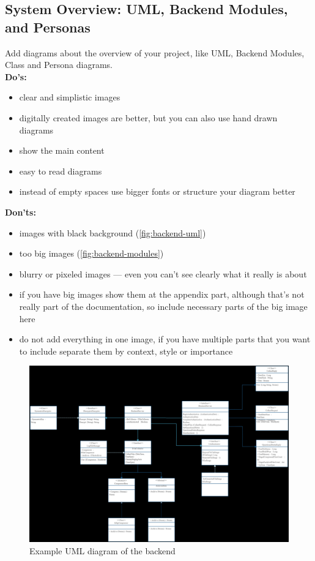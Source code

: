 \documentclass[12pt,a4paper]{article}
\begin{document}
\begin{spacing}{1.5}
    \subsection{System Overview: UML, Backend Modules, and Personas}
    Add diagrams about the overview of your project, like UML, Backend Modules,
    Class and Persona diagrams. \\ \textbf{Do's:}
    \begin{itemize}
        \item clear and simplistic images
        \item digitally created images are better, but you can also use hand drawn diagrams
        \item show the main content
        \item easy to read diagrams
        \item instead of empty spaces use bigger fonts or structure your diagram better
    \end{itemize}
    \textbf{Don'ts:}
    \begin{itemize}
        \item images with black background (\autoref{fig:backend-uml})
        \item too big images (\autoref{fig:backend-modules})
        \item blurry or pixeled images --- even you can't see clearly what it really is about
        \item if you have big images show them at the appendix part, although that's not
              really part of the documentation, so include necessary parts of the big image
              here
        \item do not add everything in one image, if you have multiple parts that you want to
              include separate them by context, style or importance
    \end{itemize}

    \begin{figure}[H]
        \centering
        \includegraphics[width=1\linewidth]{assets/backend-uml-example.png}
        \caption{Example UML diagram of the backend}
        \label{fig:backend-uml}
    \end{figure}
    \FloatBarrier


\end{spacing}
\end{document}
